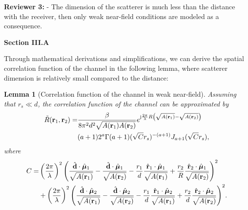 \documentclass[a4paper,12pt]{article}
\newtheorem{lemma}{\bf Lemma}
\def\onecol{}
\begin{document}
\textbf{Reviewer 3:}
-   The dimension of the scatterer is much less than the distance with the receiver, then only weak near-field conditions are modeled as a consequence.

{}

\begin{framed}
{\bf Section III.A}

\setcounter{equation}{14}

\quad Through mathematical derivations and simplifications, we can derive the spatial correlation function of the channel in the following lemma, {\color{red}where scatterer dimension is relatively small compared to the distance}:
\begin{lemma}[{\color{red}Correlation function of the channel in weak near-field}]
	Assuming that $r_s \ll d$, the correlation function of the channel can be approximated by 
	\begin{equation}
		\begin{aligned}
			\tilde{R}({\bf r}_1,{\bf r}_2) =& \frac{\beta}{8\pi^2d^2\sqrt{A({\bf r}_1)A({\bf r}_2)}}e^{{\rm j}\frac{2\pi}{\lambda}R \left(\sqrt{A({\bf r}_1)}-\sqrt{A({\bf r}_2)}\right)} \\&(a+1) 2^{a} \Gamma (a+1) (\sqrt{C}r_s)^{-(a+1)} J_{a+1} (\sqrt{C}r_s),
		\end{aligned}
	\end{equation}
	where
	\ifx\onecol\undefined
   \begin{equation}
	   \begin{aligned}
		   C =& \left( \frac{2\pi}{\lambda}  \right)^2 \Bigg( \frac{\hat{\bf d}\cdot \hat{\boldsymbol{\mu}}_1}{\sqrt{A({\bf r}_1)}} - \frac{\hat{\bf d}\cdot \hat{\boldsymbol{\mu}}_1}{\sqrt{A({\bf r}_2)}} - \frac{r_1}{d} \frac{\hat{\bf r}_1 \cdot \hat{\boldsymbol{\mu}}_1}{\sqrt{A({\bf r}_1)}} + \frac{r_2}{R} \frac{\hat{\bf r}_2 \cdot \hat{\boldsymbol{\mu}}_1}{\sqrt{A({\bf r}_2)}}\Bigg)^2 \\&+  \left( \frac{2\pi}{\lambda}  \right)^2 \Bigg( \frac{\hat{\bf d}\cdot \hat{\boldsymbol{\mu}}_2}{\sqrt{A({\bf r}_1)}} - \frac{\hat{\bf d}\cdot \hat{\boldsymbol{\mu}}_2}{\sqrt{A({\bf r}_2)}} - \frac{r_1}{d} \frac{\hat{\bf r}_1 \cdot \hat{\boldsymbol{\mu}}_2}{\sqrt{A({\bf r}_1)}} + \frac{r_2}{d} \frac{\hat{\bf r}_2 \cdot \hat{\boldsymbol{\mu}}_2}{\sqrt{A({\bf r}_2)}}\Bigg)^2.

\end{aligned}
\end{equation}
\end{lemma}
\end{framed}
\end{document}
